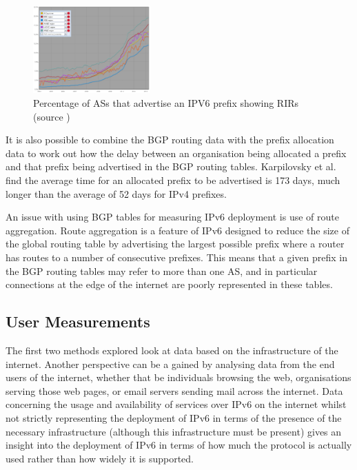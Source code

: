 \begin{figure}[htb]
\centering
\includegraphics[width=0.4\textwidth]{img/v6-bgp-rirs.png}
\caption{Percentage of ASs that advertise an IPV6 prefix showing RIRs (source
\protect\cite{ripe_ncc_total_2013})}
\label{fig:bgp-rirs}
\end{figure}

It is also possible to combine the BGP routing data with the prefix allocation
data to work out how the delay between an organisation being allocated a prefix
and that prefix being advertised in the BGP routing tables. Karpilovsky et al.
find the average time for an allocated prefix to be advertised is 173 days, much
longer than the average of 52 days for IPv4 prefixes\cite{karpilovsky_quantifying_2009}.

An issue with using BGP tables for measuring IPv6 deployment is use of route
aggregation. Route aggregation is a feature of IPv6 designed to reduce the size of the
global routing table by advertising the largest possible prefix where a router
has routes to a number of consecutive prefixes. This means that a given prefix in
the BGP routing tables may refer to more than one AS, and in particular
connections at the edge of the internet are poorly represented in these
tables\cite{dhamdhere_measuring_2012}.


\subsection{User Measurements}

The first two methods explored look at data based on the
infrastructure of the internet. Another perspective can be a gained by analysing
data from the end users of the internet, whether that be individuals browsing
the web, organisations serving those web pages, or email servers sending mail
across the internet. Data concerning the usage and availability of services over
IPv6 on the internet whilst not strictly representing the deployment of IPv6 in
terms of the presence of the necessary infrastructure (although this
infrastructure must be
present) gives an insight into the deployment of IPv6 in terms of
how much the protocol is actually used rather than how widely it is supported.


